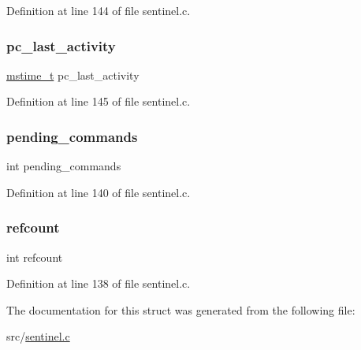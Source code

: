 Definition at line 144 of file sentinel.\+c.

\mbox{\label{structinstance_link_ad3256ba26a4f06b5cc89221c2d6bf0a6}} 
\subsubsection{\texorpdfstring{pc\+\_\+last\+\_\+activity}{pc\_last\_activity}}
{\footnotesize\ttfamily \hyperlink{redismodule_8h_a652ae61e2475bc8957454534544968fc}{mstime\+\_\+t} pc\+\_\+last\+\_\+activity}



Definition at line 145 of file sentinel.\+c.

\mbox{\label{structinstance_link_acc254a996c1faea659a20feb073d4f00}} 
\subsubsection{\texorpdfstring{pending\+\_\+commands}{pending\_commands}}
{\footnotesize\ttfamily int pending\+\_\+commands}



Definition at line 140 of file sentinel.\+c.

\mbox{\label{structinstance_link_a6022c8a609170c7365fb96e83cb2df48}} 
\subsubsection{\texorpdfstring{refcount}{refcount}}
{\footnotesize\ttfamily int refcount}



Definition at line 138 of file sentinel.\+c.



The documentation for this struct was generated from the following file\+:\begin{DoxyCompactItemize}
\item 
src/\hyperlink{sentinel_8c}{sentinel.\+c}\end{DoxyCompactItemize}
